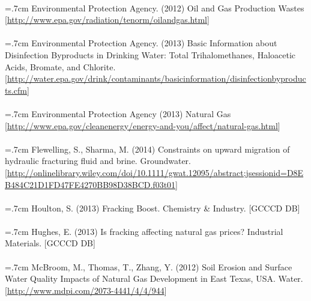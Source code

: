 \documentclass{article}
\begin{document}
  \paragraph{} \hangindent=.7cm Environmental Protection Agency. (2012) Oil and Gas Production Wastes [\url{http://www.epa.gov/radiation/tenorm/oilandgas.html}]

  \paragraph{} \hangindent=.7cm Environmental Protection Agency. (2013) Basic Information about Disinfection Byproducts in Drinking Water: Total Trihalomethanes, Haloacetic Acids, Bromate, and Chlorite. [\url{http://water.epa.gov/drink/contaminants/basicinformation/disinfectionbyproducts.cfm}]

  \paragraph{} \hangindent=.7cm Environmental Protection Agency (2013) Natural Gas [\url{http://www.epa.gov/cleanenergy/energy-and-you/affect/natural-gas.html}]

  \paragraph{} \hangindent=.7cm Flewelling, S., Sharma, M. (2014) Constraints on upward migration of hydraulic fracturing fluid and brine. Groundwater. [\url{http://onlinelibrary.wiley.com/doi/10.1111/gwat.12095/abstract;jsessionid=D8EB484C21D1FD47FE4270BB98D38BCD.f03t01}]

  \paragraph{} \hangindent=.7cm Houlton, S. (2013) Fracking Boost. Chemistry \& Industry. [GCCCD DB]

  \paragraph{} \hangindent=.7cm Hughes, E. (2013) Is fracking affecting natural gas prices? Industrial Materials. [GCCCD DB]

  \paragraph{} \hangindent=.7cm McBroom, M., Thomas, T., Zhang, Y. (2012) Soil Erosion and Surface Water Quality Impacts of Natural Gas Development in East Texas, USA. Water.  [\url{http://www.mdpi.com/2073-4441/4/4/944}]
\end{document}
